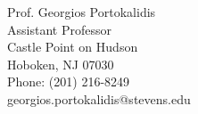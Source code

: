 \documentclass[10pt,a4]{article}
\begin{document}
\begin{small}
\begin{footnotesize}
\begin{multicols}{2}
\noindent
Prof. Georgios Portokalidis \\
Assistant Professor \\
Castle Point on Hudson \\
Hoboken, NJ 07030 \\
Phone: (201) 216-8249 \\
 georgios.portokalidis@stevens.edu \\
\end{multicols}


\end{footnotesize}
\end{small}
\end{document}
